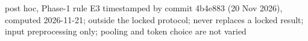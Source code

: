 post hoc, Phase-1 rule E3 timestamped by commit 4b4e883 (20 Nov 2026), computed 2026-11-21; outside the locked protocol; never replaces a locked result; input preprocessing only; pooling and token choice are not varied
